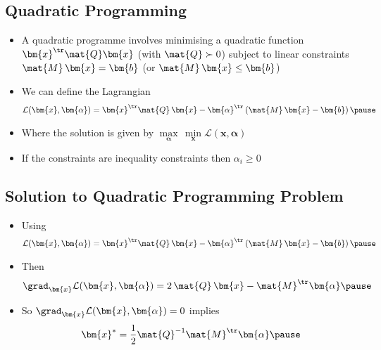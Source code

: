 
\begin{slide}
\section[-2]{Quadratic Programming}

\begin{PauseHighLight}
  \begin{itemize}
  \item A quadratic programme involves minimising a quadratic function
    $\bm{x}^\tr \mat{Q} \bm{x}$ (with $\mat{Q}\succ 0$) subject to
    linear constraints $\mat{M}\,\bm{x} = \bm{b}$ (or
    $\mat{M}\,\bm{x} \leq \bm{b}$)\pause
  \item We can define the Lagrangian
    \begin{align*}
      \mathcal{L}(\bm{x},\bm{\alpha}) = \bm{x}^\tr \mat{Q}\, \bm{x} -
      \bm{\alpha}^\tr \left( \mat{M}\,\bm{x} - \bm{b}\right)\pause
    \end{align*}
  \item Where the solution is given by $\max\limits_{\bm{\alpha}} \,
    \min\limits_{\bm{x}}  \mathcal{L}(\bm{x},\bm{\alpha})$\pause
  \item If the constraints are inequality constraints then
    $\alpha_i\geq0$\pause
  \end{itemize}
\end{PauseHighLight}

\end{slide}


\begin{slide}
\section{Solution to Quadratic Programming Problem}

\begin{PauseHighLight}
  \begin{itemize}
  \item Using
    \begin{align*}
      \mathcal{L}(\bm{x},\bm{\alpha}) = \bm{x}^\tr \mat{Q}\, \bm{x} -
      \bm{\alpha}^\tr \left( \mat{M}\,\bm{x} - \bm{b}\right)\pause
    \end{align*}
  \item Then
    \begin{align*}
      \grad_{\bm{x}} \mathcal{L}(\bm{x},\bm{\alpha}) =  2\, \mat{Q}\,
      \bm{x} - \mat{M}^\tr \bm{\alpha}\pause
    \end{align*}
  \item So $\grad_{\bm{x}} \mathcal{L}(\bm{x},\bm{\alpha}) = 0$
    implies
    \begin{align*}
      \bm{x}^* = \frac{1}{2} \mat{Q}^{-1} \mat{M}^\tr \bm{\alpha}\pause
    \end{align*}
  \end{itemize}
\end{PauseHighLight}

\end{slide}

